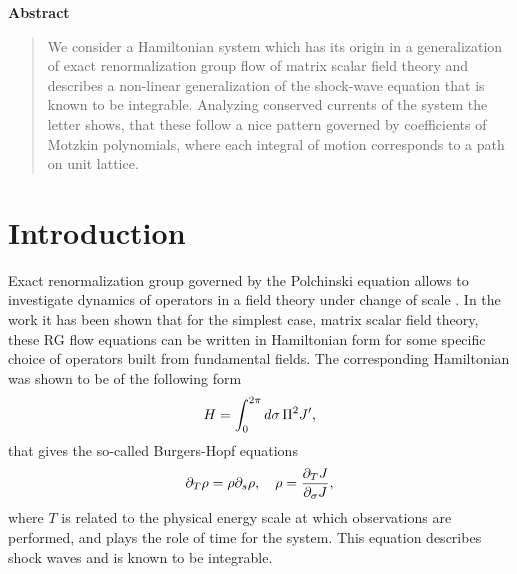 \documentclass[12pt]{article}%
\numberwithin{equation}{section}
\begin{document}
\begin{titlepage}
\vspace{1cm}
\begin{center} 
\textbf{Abstract}
\end{center} 
\begin{quote}
We consider a Hamiltonian system which has its origin in a generalization of exact renormalization group flow of matrix scalar field theory and describes a non-linear generalization of the shock-wave equation that is known to be integrable. Analyzing conserved currents of the system the letter shows, that these follow a nice pattern governed by coefficients of Motzkin polynomials, where each integral of motion corresponds to a path on unit lattice.
\end{quote} 
\vfill



\setcounter{footnote}{0}




\end{titlepage}




\clearpage
\setcounter{page}{2}



\tableofcontents



\section{Introduction}

Exact renormalization group governed by the Polchinski equation allows to investigate dynamics of operators in a field theory under change of scale \cite{Polchinski:1983gv,Bervillier:2004mf}. In the work \cite{Akhmedov:2010mz} it has been shown that for the simplest case, matrix scalar field theory, these RG flow equations can be written in Hamiltonian form for some specific choice of operators built from fundamental fields. The corresponding Hamiltonian was shown to be of the following form
\begin{equation} 
H=\int_0^{2\pi} d\sigma\,\Pi^2J',
\end{equation}
that gives the so-called Burgers-Hopf equations 
\begin{equation}
\label{BH}
\partial_T\rho= \rho \partial_s \rho, \quad \rho= \frac{\partial_T{J}}{\partial_\sigma J},
\end{equation}
where $T$ is related to the physical energy scale at which observations are performed, and plays the role of time for the system. This equation describes shock waves and is known to be integrable. 
\end{document}
